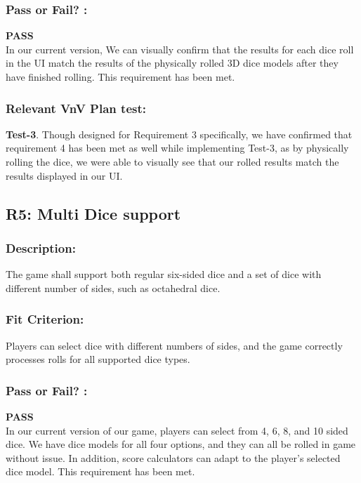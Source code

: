 \documentclass[12pt, titlepage]{article}
\begin{document}
\subsubsection*{Pass or Fail? :} 
 
  \noindent \textbf{PASS}\\
 
 In our current version, We can visually confirm that the results for each dice roll in the UI match the results of the physically rolled 3D dice models after they have finished rolling. This requirement has been met.
 
  \subsubsection*{Relevant VnV Plan test: } \textbf{ Test-3}. Though designed for Requirement 3 specifically, we have confirmed that requirement 4 has been met as well while implementing Test-3, as by physically rolling the dice, we were able to visually see that our rolled results match the results displayed in our UI.
  
  
\subsection{R5: Multi Dice support} 
\label{R5} 

\subsubsection*{Description:}The game shall support both regular six-sided dice and a set of dice with different number of sides, such as octahedral dice.

\subsubsection*{Fit Criterion:} Players can select dice with different numbers of sides, and the game correctly processes rolls for all supported dice types.

\subsubsection*{Pass or Fail? :} 

 \noindent \textbf{PASS}\\
 
In our current version of our game, players can select from 4, 6, 8, and 10 sided dice. We have dice models for all four options, and they can all be rolled in game without issue. In addition, score calculators can adapt to the player's selected dice model. This requirement has been met.
\end{document}
